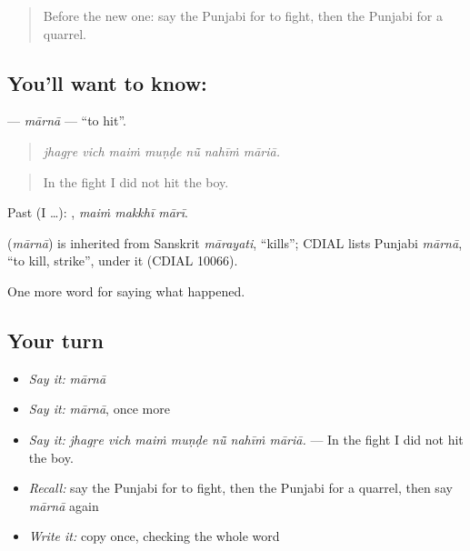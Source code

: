 \label{lesson:PA-C316-maarna}



\begin{quote}
Before the new one: say the Punjabi for to fight, then the Punjabi for a quarrel.
\end{quote}

\subsection*{You'll want to know: }
\textbf{} — \emph{mārnā} — \textquotedblleft{}to hit\textquotedblright{}.

\begin{quote}
      
\end{quote}

\begin{quote}
\emph{jhagṛe vich maiṁ muṇḍe nū̃ nahīṁ māriā.}
\end{quote}

\begin{quote}
In the fight I did not hit the boy.
\end{quote}

Past (I …):   , \emph{maiṁ makkhī mārī}.

\begin{cousinweb}
\textbf{} (\emph{mārnā}) is inherited from Sanskrit \emph{mārayati}, \textquotedblleft{}kills\textquotedblright{}; CDIAL lists Punjabi \emph{mārnā}, \textquotedblleft{}to kill, strike\textquotedblright{}, under it (CDIAL 10066).
\end{cousinweb}

\begin{grammarlens}[title={What you've built}]
One more word for saying what happened.
\end{grammarlens}

\subsection*{Your turn}
\begin{itemize}
\raggedright
  \item \emph{Say it:} \emph{mārnā}
  \item \emph{Say it:} \emph{mārnā}, once more
  \item \emph{Say it:} \emph{jhagṛe vich maiṁ muṇḍe nū̃ nahīṁ māriā.} — In the fight I did not hit the boy.
  \item \emph{Recall:} say the Punjabi for to fight, then the Punjabi for a quarrel, then say \emph{mārnā} again
  \item \emph{Write it:} copy \textbf{} once, checking the whole word
\end{itemize}

